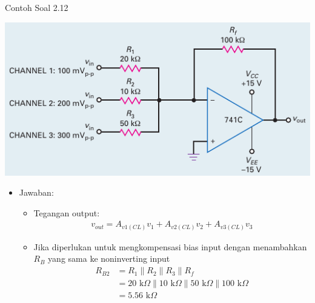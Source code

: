 \begin{frame}{Contoh Soal 2.12}
	\begin{multicols}{2}
		\begin{center}
			\includegraphics[width=\linewidth]{gambar/fig-16.25}
		\end{center}
		\columnbreak
		\begin{itemize}
			\item Jawaban:
			\begin{itemize}
				\item Tegangan output:
				\begin{align*}
					v_{out} = A_{v1(CL)} v_1 + A_{v2(CL)} v_2 + A_{v3(CL)} v_3
				\end{align*}
				\item Jika diperlukan untuk mengkompensasi bias input dengan menambahkan $ R_B $ yang sama ke noninverting input
				\begin{align*}
					R_{B2} &= R_1 \parallel R_2 \parallel R_3 \parallel R_f \\
					&= 20 \text{ k}\Omega \parallel 10 \text{ k}\Omega \parallel 50 \text{ k}\Omega \parallel 100 \text{ k}\Omega \\
					&= 5.56 \text{ k}\Omega
				\end{align*}
			\end{itemize}
		\end{itemize}
	\end{multicols}
\end{frame}

